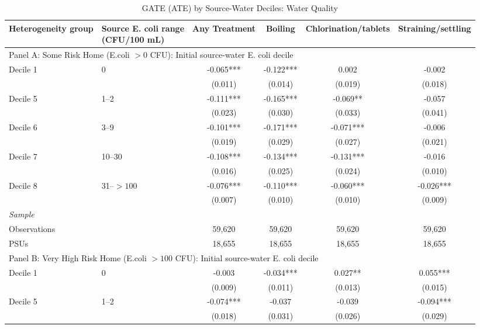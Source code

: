\begin{landscape}
\begin{table}[p]
\centering
\caption{GATE (ATE) by Source-Water Deciles: Water Quality}
\label{tab:table_gate_main_deciles-ecoli}
\scriptsize\setlength{\tabcolsep}{4pt}
\begin{adjustbox}{max width=\linewidth, center}
\begin{tabular}{llcccc}
\toprule
Heterogeneity group & \shortstack{Source E. coli range\\(CFU/100 mL)} & Any Treatment & Boiling & Chlorination/tablets & Straining/settling \\
\midrule
\multicolumn{6}{l}{Panel A: Some Risk Home (E.coli $>0$ CFU): Initial source-water E. coli decile} \\
Decile 1 & 0 & -0.065*** & -0.122*** & 0.002 & -0.002 \\
 &  & (0.011) & (0.014) & (0.019) & (0.018) \\
Decile 5 & 1--2 & -0.111*** & -0.165*** & -0.069** & -0.057 \\
 &  & (0.023) & (0.030) & (0.033) & (0.041) \\
Decile 6 & 3--9 & -0.101*** & -0.171*** & -0.071*** & -0.006 \\
 &  & (0.019) & (0.029) & (0.027) & (0.021) \\
Decile 7 & 10--30 & -0.108*** & -0.134*** & -0.131*** & -0.016 \\
 &  & (0.016) & (0.025) & (0.024) & (0.010) \\
Decile 8 & 31--$>100$ & -0.076*** & -0.110*** & -0.060*** & -0.026*** \\
 &  & (0.007) & (0.010) & (0.010) & (0.009) \\
\multicolumn{6}{l}{\textit{Sample}} \\
\quad Observations &  & 59,620 & 59,620 & 59,620 & 59,620 \\
\quad PSUs &  & 18,655 & 18,655 & 18,655 & 18,655 \\
\midrule
\multicolumn{6}{l}{Panel B: Very High Risk Home (E.coli $>100$ CFU): Initial source-water E. coli decile} \\
Decile 1 & 0 & -0.003 & -0.034*** & 0.027** & 0.055*** \\
 &  & (0.009) & (0.011) & (0.013) & (0.015) \\
Decile 5 & 1--2 & -0.074*** & -0.037 & -0.039 & -0.094*** \\
 &  & (0.018) & (0.031) & (0.026) & (0.029) \\

\end{tabular}
\end{adjustbox}
\end{table}
\end{landscape}
